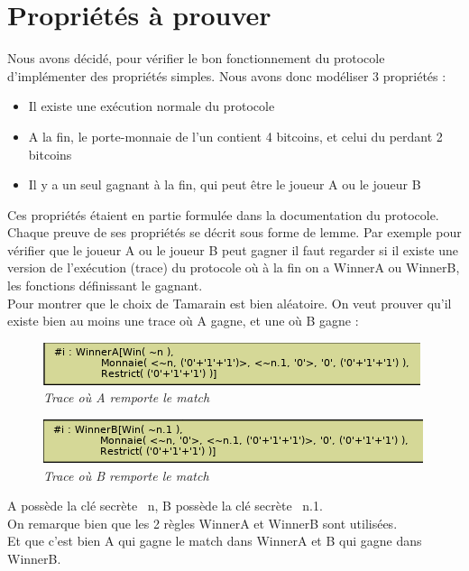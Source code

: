 \documentclass[conference]{IEEEtran}
\begin{document}
\section{Propriétés à prouver}
\label{sec:sec-5}
Nous avons décidé, pour vérifier le bon fonctionnement du protocole d'implémenter des propriétés simples. Nous avons donc modéliser 3 propriétés :
\begin{itemize}
    \item Il existe une exécution normale du protocole
    \item A la fin, le porte-monnaie de l'un contient 4 bitcoins, et celui du perdant 2 bitcoins
    \item Il y a un seul gagnant à la fin, qui peut être le joueur A ou le joueur B \\
\end{itemize}
Ces propriétés étaient en partie formulée dans la documentation du protocole.
Chaque preuve de ses propriétés se décrit sous forme de lemme. Par exemple pour vérifier que le joueur A ou le joueur B peut gagner il faut regarder si il existe une version de l'exécution (trace) du protocole où à la fin on a WinnerA ou WinnerB, les fonctions définissant le gagnant.\\

Pour montrer que le choix de Tamarain est bien aléatoire. On veut prouver qu'il existe bien au moins une trace où A gagne, et une où B gagne : 
\begin{figure}[!h]
    \centering
    \includegraphics[scale=0.62]{winnerA.png}
    \caption{\textit{Trace où A remporte le match}}
    \label{fig:winnerA}
\end{figure}
\begin{figure}[!h]
    \centering
    \includegraphics[scale=0.62]{winnerB.png}
    \caption{\textit{Trace où B remporte le match}}
    \label{fig:winnerB}
\end{figure}


A possède la clé secrète ~n, B possède la clé secrète ~n.1. \\On remarque bien que les 2 règles WinnerA et WinnerB sont utilisées. \\Et que c'est bien A qui gagne le match dans WinnerA et B qui gagne dans WinnerB. 
\end{document}
